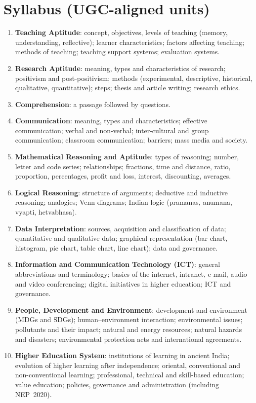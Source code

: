 \section*{Syllabus (UGC-aligned units)}
\begin{enumerate}[leftmargin=2em]
\item \textbf{Teaching Aptitude}: concept, objectives, levels of teaching (memory, understanding, reflective); learner characteristics; factors affecting teaching; methods of teaching; teaching support systems; evaluation systems.
\item \textbf{Research Aptitude}: meaning, types and characteristics of research; positivism and post-positivism; methods (experimental, descriptive, historical, qualitative, quantitative); steps; thesis and article writing; research ethics.
\item \textbf{Comprehension}: a passage followed by questions.
\item \textbf{Communication}: meaning, types and characteristics; effective communication; verbal and non-verbal; inter-cultural and group communication; classroom communication; barriers; mass media and society.
\item \textbf{Mathematical Reasoning and Aptitude}: types of reasoning; number, letter and code series; relationships; fractions, time and distance, ratio, proportion, percentages, profit and loss, interest, discounting, averages.
\item \textbf{Logical Reasoning}: structure of arguments; deductive and inductive reasoning; analogies; Venn diagrams; Indian logic (pramanas, anumana, vyapti, hetvabhasa).
\item \textbf{Data Interpretation}: sources, acquisition and classification of data; quantitative and qualitative data; graphical representation (bar chart, histogram, pie chart, table chart, line chart); data and governance.
\item \textbf{Information and Communication Technology (ICT)}: general abbreviations and terminology; basics of the internet, intranet, e-mail, audio and video conferencing; digital initiatives in higher education; ICT and governance.
\item \textbf{People, Development and Environment}: development and environment (MDGs and SDGs); human--environment interaction; environmental issues; pollutants and their impact; natural and energy resources; natural hazards and disasters; environmental protection acts and international agreements.
\item \textbf{Higher Education System}: institutions of learning in ancient India; evolution of higher learning after independence; oriental, conventional and non-conventional learning; professional, technical and skill-based education; value education; policies, governance and administration (including NEP~2020).
\end{enumerate}

